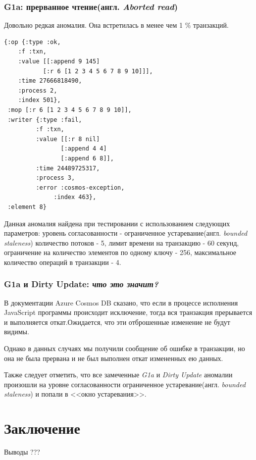 \documentclass[12pt,  openany]{book}
\begin{document}
\subsection{G1a: прерванное чтение(англ. \textit{Aborted read})}
Довольно редкая аномалия. Она встретилась в менее чем 1 \% транзакций.
\begin{lstlisting}[caption={Пример G1a аномалии}]
{:op {:type :ok,
	:f :txn,
	:value [[:append 9 145]
		   [:r 6 [1 2 3 4 5 6 7 8 9 10]]],
	:time 27666818490,
	:process 2,
	:index 501},
 :mop [:r 6 [1 2 3 4 5 6 7 8 9 10]],
 :writer {:type :fail,
	     :f :txn,
	     :value [[:r 8 nil]
		        [:append 4 4]
		        [:append 6 8]],
	     :time 24489725317,
	     :process 3,
	     :error :cosmos-exception,
              :index 463},
 :element 8}
\end{lstlisting}
\par
Данная аномалия найдена при тестировании с использованием следующих параметров: уровень согласованности - ограниченное устаревание(англ.  \textit{bounded staleness})  количество потоков - 5, лимит времени на транзакцию - 60 секунд, ограничение на количество элементов по одному ключу - 256, максимальное количество операций в транзакции - 4.

\subsection{G1a и Dirty Update: \textit{что это значит?}}
В документации Azure Cosmos DB сказано, что если в процессе исполнения JavaScript программы происходит исключение, тогда вся транзакция прерывается и выполняется откат.Ожидается, что эти отброшенные изменение не будут видимы.
\par
Однако в данных случаях мы получили сообщение об ошибке в транзакции, но она не была прервана и не был выполнен откат измененных ею данных.
\par
Также следует отметить, что все замеченные \textit{G1a} и \textit{Dirty Update} аномалии произошли на уровне согласованности ограниченное устаревание(англ.  \textit{bounded staleness}) и попали в <<окно устаревания>>.  

\chapter{Заключение}
Выводы
???


\end{document}
